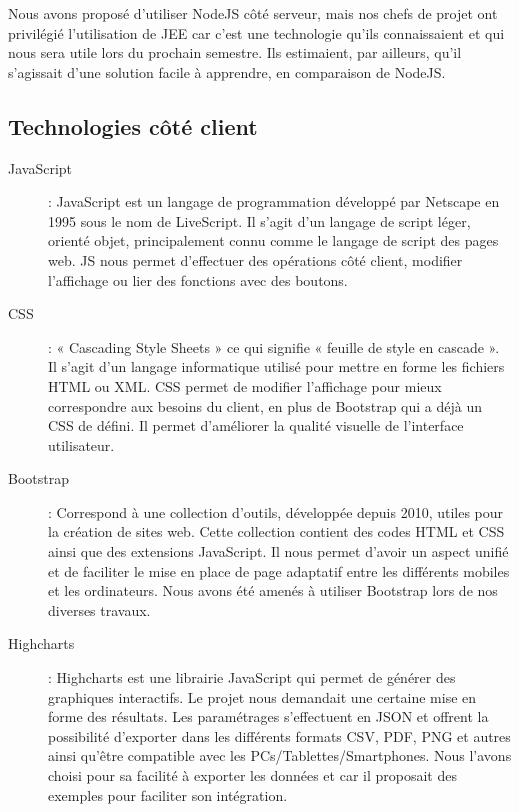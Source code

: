Nous avons proposé d'utiliser NodeJS côté serveur, mais nos chefs de projet ont privilégié l'utilisation de JEE car c'est une technologie qu'ils connaissaient et qui nous sera utile lors du prochain semestre. Ils estimaient, par ailleurs, qu'il s'agissait d'une solution facile à apprendre, en comparaison de NodeJS. 

\subsection{Technologies côté client}

\begin{description}

\item[JavaScript] : JavaScript est un langage de programmation développé par Netscape en 1995 sous le nom de LiveScript. Il s'agit d'un langage de script léger, orienté objet, principalement connu comme le langage de script des pages web. 
JS nous permet d'effectuer des opérations côté client, modifier l'affichage ou lier des fonctions avec des boutons.\

\item[CSS] : « Cascading Style Sheets » ce qui signifie « feuille de style en cascade ». 
Il s'agit d'un langage informatique utilisé pour mettre en forme les fichiers HTML ou XML. 
CSS permet de modifier l'affichage pour mieux correspondre aux besoins du client, en plus de Bootstrap qui a déjà un CSS de défini. Il permet d'améliorer la qualité visuelle de l'interface utilisateur. \

\item[Bootstrap] : Correspond à une collection d'outils, développée depuis 2010, utiles pour la création de sites web. Cette collection contient des codes HTML et CSS ainsi que des extensions JavaScript. 
Il nous permet d'avoir un aspect unifié et de faciliter le mise en place de page adaptatif entre les différents mobiles et les ordinateurs. Nous avons été amenés à utiliser Bootstrap lors de nos diverses travaux.  \

\item[Highcharts] : Highcharts est une librairie JavaScript qui permet de générer des graphiques interactifs. Le projet nous demandait une certaine mise en forme des résultats. Les paramétrages s'effectuent en JSON et offrent la possibilité d'exporter dans les différents formats CSV, PDF, PNG et autres ainsi qu'être compatible avec les PCs/Tablettes/Smartphones.
Nous l'avons choisi pour sa facilité à exporter les données et car il proposait des exemples pour faciliter son intégration.

\end{description}

